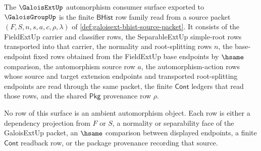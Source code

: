 \begin{definition}
\label{def:galoisext-automorphism-consumer-surface}
The $\GaloisExtUp$ automorphism consumer surface exported to
$\GaloisGroupUp$ is the finite $\mathsf{BHist}$ row family read from a source
packet $(F,S,n,s,a,c,\rho,\lambda)$ of
\autoref{def:galoisext-bhist-source-packet}. It consists of the FieldExtUp
carrier and classifier rows, the SeparableExtUp simple-root rows transported
into that carrier, the normality and root-splitting rows $n$, the base-endpoint
fixed rows obtained from the FieldExtUp base endpoints by $\hsame$ comparison,
the automorphism source row $a$, the automorphism-action rows whose source and
target extension endpoints and
transported root-splitting endpoints are read through the same packet, the
finite $\mathsf{Cont}$ ledgers that read those rows, and the shared
$\mathsf{Pkg}$ provenance row $\rho$.

No row of this surface is an ambient automorphism object. Each row is either a
dependency projection from $F$ or $S$, a normality or separability face of the
GaloisExtUp packet, an $\hsame$ comparison between displayed endpoints, a
finite $\mathsf{Cont}$ readback row, or the package provenance recording that
source.
\end{definition}

